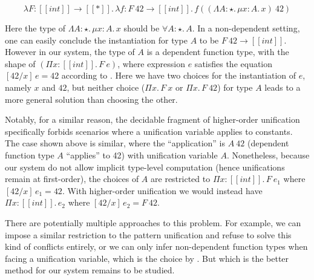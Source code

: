 \begin{equation*}
    \lambda F : [[int]] \rightarrow [[*]].\, \lambda f : F~42 \rightarrow [[int]].\, f ((\Lambda A : \star.\,\mu x : A.\, x)~42)
\end{equation*}

Here the type of $\Lambda A : \star.\,\mu x : A.\, x$ should be $\forall A : \star.\, A$.
In a non-dependent setting, one can easily conclude the instantiation for type $A$ to be
$F~42 \rightarrow [[int]]$. However in our system, the type of $A$ is a
dependent function type, with the shape of $(\Pi x : [[int]].\, F~e)$,
where expression $e$ satisfies the equation $[42/x]\,e = 42$ according to .
Here we have two choices for the instantiation of $e$, namely $x$ and $42$,
but neither choice ($\Pi x.\, F~x$ or $\Pi x.\, F~42$) for type $A$ leads to a more general
solution than choosing the other.

Notably, for a similar reason, the decidable
fragment of higher-order unification~\cite{patternunification} specifically
forbids scenarios where a unification variable applies to constants.
The case shown above is similar, where the ``application'' is $A~42$
(dependent function type $A$ ``applies'' to 42) with unification variable $A$.
Nonetheless, because our system do not allow implicit type-level
computation (hence unifications remain at first-order),
the choices of $A$ are restricted to $\Pi x : [[int]].\,F~e_1$ where $[42/x]\,e_1 = 42$.
With higher-order unification we would instead
have $\Pi x : [[int]].\, e_2$ where $[42/x]\,e_2 = F~42$.

There are potentially multiple approaches to this problem. For example, we can
impose a similar restriction to the pattern unification and refuse to solve
this kind of conflicts entirely, or we can only infer non-dependent function types when
facing a unification variable, which is the choice by \citet{dh}. But which is
the better method for our system remains to be studied.


